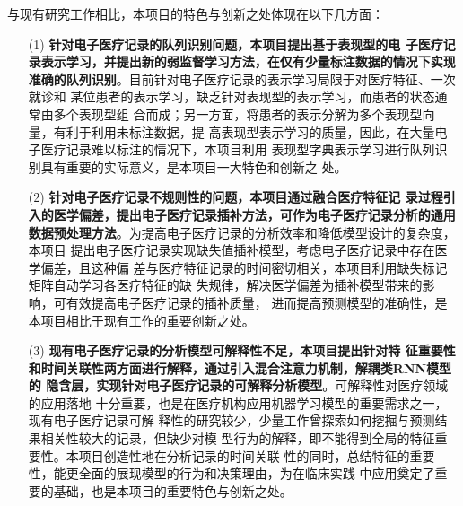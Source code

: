 与现有研究工作相比，本项目的特色与创新之处体现在以下几方面：

\begin{itemize}
    \item[(1)] \textbf{针对电子医疗记录的队列识别问题，本项目提出基于表现型的电
    子医疗记录表示学习，并提出新的弱监督学习方法，在仅有少量标注数据的情况下实现
    准确的队列识别}。目前针对电子医疗记录的表示学习局限于对医疗特征、一次就诊和
    某位患者的表示学习，缺乏针对表现型的表示学习，而患者的状态通常由多个表现型组
    合而成；另一方面，将患者的表示分解为多个表现型向量，有利于利用未标注数据，提
    高表现型表示学习的质量，因此，在大量电子医疗记录难以标注的情况下，本项目利用
    表现型字典表示学习进行队列识别具有重要的实际意义，是本项目一大特色和创新之
    处。
    \item[(2)] \textbf{针对电子医疗记录不规则性的问题，本项目通过融合医疗特征记
    录过程引入的医学偏差，提出电子医疗记录插补方法，可作为电子医疗记录分析的通用
    数据预处理方法}。为提高电子医疗记录的分析效率和降低模型设计的复杂度，本项目
    提出电子医疗记录实现缺失值插补模型，考虑电子医疗记录中存在医学偏差，且这种偏
    差与医疗特征记录的时间密切相关，本项目利用缺失标记矩阵自动学习各医疗特征的缺
    失规律，解决医学偏差为插补模型带来的影响，可有效提高电子医疗记录的插补质量，
    进而提高预测模型的准确性，是本项目相比于现有工作的重要创新之处。 
    \item[(3)] \textbf{现有电子医疗记录的分析模型可解释性不足，本项目提出针对特
    征重要性和时间关联性两方面进行解释，通过引入混合注意力机制，解耦类RNN模型的
    隐含层，实现针对电子医疗记录的可解释分析模型}。可解释性对医疗领域的应用落地
    十分重要，也是在医疗机构应用机器学习模型的重要需求之一，现有电子医疗记录可解
    释性的研究较少，少量工作曾探索如何挖掘与预测结果相关性较大的记录，但缺少对模
    型行为的解释，即不能得到全局的特征重要性。本项目创造性地在分析记录的时间关联
    性的同时，总结特征的重要性，能更全面的展现模型的行为和决策理由，为在临床实践
    中应用奠定了重要的基础，也是本项目的重要特色与创新之处。
\end{itemize}